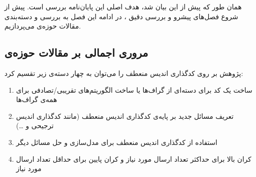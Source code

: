  همان طور که پیش از این بیان شد، هدف اصلی این پایان‌نامه بررسی
 \picod
 است. پیش از شروع فصل‌های پیشرو و بررسی دقیق 
 \picods، در ادامه این فصل به بررسی و دسته‌بندی مقالات حوزه‌ی
  \picod
  می‌پردازیم.
 \subsection{مروری اجمالی بر مقالات حوزه‌ی
 	\picod}
  پژوهش بر روی کدگذاری اندیس منعطف را می‌توان به چهار دسته‌ی زیر تقسیم کرد:
 \begin{enumerate}
 	\item 
 	ساخت یک کد برای دسته‌ای از گراف‌ها یا ساخت الگوریتم‌های تقریبی/تصادفی برای همه‌ی گراف‌ها
 	\item 
 	تعریف مسائل جدید بر پایه‌ی کدگذاری اندیس منعطف (مانند کدگذاری اندیس ترجیحی و \ldots)
 	\item 
 	استفاده از کدگذاری اندیس منعطف برای مدل‌سازی و حل مسائل دیگر
 	\item 
 	کران بالا برای حداکثر تعداد ارسال مورد نیاز و کران پایین برای حداقل تعداد ارسال مورد نیاز
 \end{enumerate}
 
